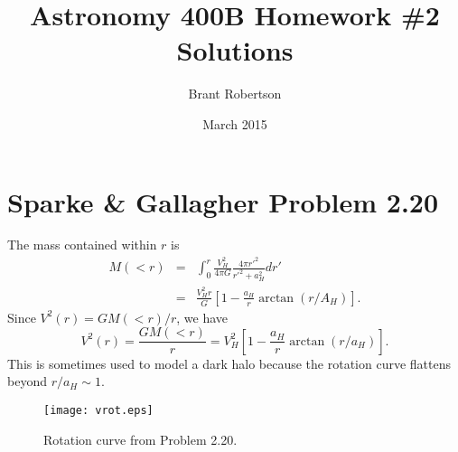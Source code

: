 \documentclass[]{article}
\title{Astronomy 400B Homework \#2 Solutions}
\author{Brant Robertson}
\date{March 2015}
\begin{document}
\maketitle

\section{Sparke \& Gallagher Problem 2.20}

The mass contained within $r$ is
\begin{eqnarray}
M(<r) &=& \int_{0}^{r} \frac{V_H^2}{4\pi G}\frac{4\pi r'^2}{r'^2 + a_H^2}dr'\\
&=& \frac{V_H^2 r}{G}\left[1 - \frac{a_H}{r}\arctan(r/A_H)\right].
\end{eqnarray}
\noindent
Since $V^2(r) = GM(<r)/r$, we have
\begin{equation}
V^2(r) = \frac{GM(<r)}{r} = V_H^2\left[1 - \frac{a_H}{r}\arctan(r/a_H)\right].
\end{equation}
\noindent
This is sometimes used to model a dark halo because the rotation curve flattens beyond $r/a_H\sim1$.
\begin{figure}
\begin{center}
\texttt{[image: vrot.eps]}
\caption{Rotation curve from Problem 2.20.}
\end{center}
\end{figure}
\end{document}
